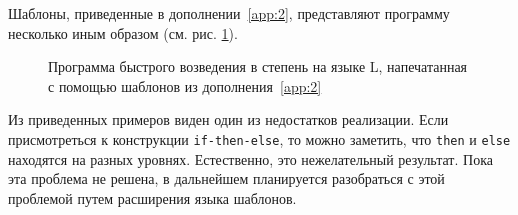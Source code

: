 Шаблоны, приведенные в дополнении~\ref{app:2}, представляют программу несколько иным образом (см. рис. \ref{fig:secondTemplatePow}).

\begin{figure}[h!]
	
	\caption{Программа быстрого возведения в степень на языке L, напечатанная с помощью шаблонов из дополнения~\ref{app:2}}
	\label{fig:secondTemplatePow}
\end{figure}

Из приведенных примеров виден один из недостатков реализации. Если присмотреться к конструкции \lstinline{if-then-else}, то можно заметить, что \lstinline{then} и \lstinline{else} находятся на разных уровнях. Естественно, это нежелательный результат. Пока эта проблема не решена, в дальнейшем планируется разобраться с этой проблемой путем расширения языка шаблонов.